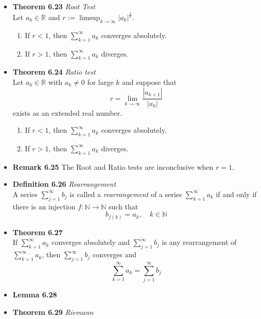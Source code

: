 \documentclass[11pt,a4paper]{article}
\begin{document}
\begin{itemize}
    \item \textbf{Theorem 6.23} \emph{Root Test} \\
        Let $a_k \in \mathbb{R}$ and $r := \limsup_{k \to \infty} |a_k|^{\frac{1}{k}}$.
        \begin{enumerate}
            \item If $r < 1$, then $\sum_{k=1}^\infty a_k$ converges absolutely.
            \item If $r > 1$, then $\sum_{k=1}^\infty a_k$ diverges.
        \end{enumerate}

    \item \textbf{Theorem 6.24} \emph{Ratio test} \\
        Let $a_k \in \mathbb{R}$ with $a_k \neq 0$ for large $k$ and suppose that
        \[
            r = \lim_{k \to \infty} \frac{|a_{k+1}|}{|a_k|}
        \]
        exists as an extended real number.
        \begin{enumerate}
            \item If $r < 1$, then $\sum_{k=1}^\infty a_k$ converges absolutely.
            \item If $r > 1$, then $\sum_{k=1}^\infty a_k$ diverges.
        \end{enumerate}

    \item \textbf{Remark 6.25}
        The Root and Ratio tests are inconclusive when $r = 1$.

    \item \textbf{Definition 6.26} \emph{Rearrangement} \\
        A series $\sum_{j=1}^\infty b_j$ is called a \emph{rearrangement} of a series
        $\sum_{k=1}^\infty a_k$ if and only if there is an injection
        $f : \mathbb{N} \to \mathbb{N}$ such that
        \[
            b_{f(k)} = a_k, \quad k \in \mathbb{N}
        \]

    \item \textbf{Theorem 6.27} \\
        If $\sum_{k=1}^\infty a_k$ converges absolutely and $\sum_{j=1}^\infty b_j$
        is any rearrangement of $\sum_{k=1}^\infty a_k$, then $\sum_{j=1}^\infty b_j$
        converges and
        \[
            \sum_{k=1}^\infty a_k = \sum_{j=1}^\infty b_j
        \]

    \item \textbf{Lemma 6.28}
    \item \textbf{Theorem 6.29} \emph{Riemann}

\end{itemize}
\end{document}
